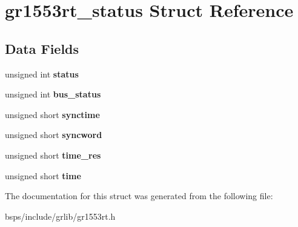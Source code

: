 \hypertarget{structgr1553rt__status}{}\section{gr1553rt\+\_\+status Struct Reference}
\label{structgr1553rt__status}
\subsection*{Data Fields}
\begin{DoxyCompactItemize}
\item 
\mbox{\label{structgr1553rt__status_a65fef76a48b56f16e39591db56222c3c}} 
unsigned int {\bfseries status}
\item 
\mbox{\label{structgr1553rt__status_a743f03e060c7abc2745314b3e20e1e72}} 
unsigned int {\bfseries bus\+\_\+status}
\item 
\mbox{\label{structgr1553rt__status_a182a51de45cb527b4606c1c58b898ac1}} 
unsigned short {\bfseries synctime}
\item 
\mbox{\label{structgr1553rt__status_ace02305fe81ed64c26ed1e3a401b8b5a}} 
unsigned short {\bfseries syncword}
\item 
\mbox{\label{structgr1553rt__status_a8a102468539abe6b54d1a775983773fc}} 
unsigned short {\bfseries time\+\_\+res}
\item 
\mbox{\label{structgr1553rt__status_ad3b14daf2e70d262f7bfa1b62044d0d6}} 
unsigned short {\bfseries time}
\end{DoxyCompactItemize}


The documentation for this struct was generated from the following file\+:\begin{DoxyCompactItemize}
\item 
bsps/include/grlib/gr1553rt.\+h\end{DoxyCompactItemize}
